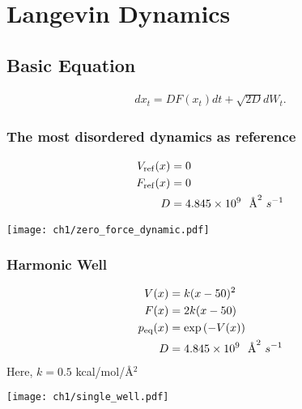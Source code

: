 \chapter{Langevin Dynamics}
\section{Basic Equation}
\begin{definition}
\begin{align}
        dx_t=D F(x_t)dt  + \sqrt{2D}d{W}_t.
\end{align}
\label{langevin}
\end{definition}

\subsection{The most disordered dynamics as reference}
\begin{align}
      V_{\rm ref}(x) &= 0\\
      F_{\rm ref}(x) &= 0\\
      D &= 4.845 \times 10^{9}~~\text{\AA}^2~s^{-1}  
\end{align}

\begin{center}
        \texttt{[image: ch1/zero\_force\_dynamic.pdf]} 
\end{center}

\subsection{Harmonic Well}
\begin{align}
        V(x) &= k (x-50)^2\\
        F(x) &= 2k(x-50)  \\
        p_{\rm eq}(x) &= \exp{(-V(x))} \\
        D &= 4.845 \times 10^{9}~~\text{\AA}^2~s^{-1}
\end{align}
Here, $k=0.5$ kcal/mol/Å$^2$
\begin{center}
        \texttt{[image: ch1/single\_well.pdf]} 
\end{center}

